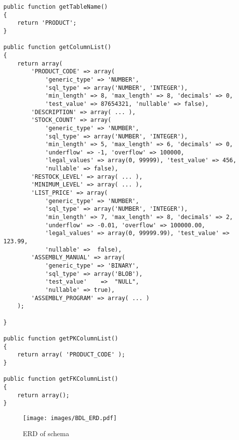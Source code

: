 \documentclass[sigconf, authordraft]{acmart}
\begin{document}
\begin{table}
    \footnotesize
    \begin{verbatim}
public function getTableName()
{
    return 'PRODUCT';
}

public function getColumnList()
{
    return array(
        'PRODUCT_CODE' => array(
            'generic_type' => 'NUMBER',
            'sql_type' => array('NUMBER', 'INTEGER'),
            'min_length' => 8, 'max_length' => 8, 'decimals' => 0,
            'test_value' => 87654321, 'nullable' => false),
        'DESCRIPTION' => array( ... ),
        'STOCK_COUNT' => array(
            'generic_type' => 'NUMBER',
            'sql_type' => array('NUMBER', 'INTEGER'),
            'min_length' => 5, 'max_length' => 6, 'decimals' => 0,
            'underflow' => -1, 'overflow' => 100000,
            'legal_values' => array(0, 99999), 'test_value' => 456,
            'nullable' => false),
        'RESTOCK_LEVEL' => array( ... ),
        'MINIMUM_LEVEL' => array( ... ),
        'LIST_PRICE' => array(
            'generic_type' => 'NUMBER',
            'sql_type' => array('NUMBER', 'INTEGER'),
            'min_length' => 7, 'max_length' => 8, 'decimals' => 2,
            'underflow' => -0.01, 'overflow' => 100000.00,
            'legal_values' => array(0, 99999.99), 'test_value' => 123.99,
            'nullable' =>  false),
        'ASSEMBLY_MANUAL' => array(
            'generic_type' => 'BINARY',
            'sql_type' => array('BLOB'),
            'test_value'    =>  "NULL",
            'nullable' => true),
        'ASSEMBLY_PROGRAM' => array( ... )
    );

}

public function getPKColumnList()
{
    return array( 'PRODUCT_CODE' );
}

public function getFKColumnList()
{
    return array();
}   \end{verbatim}
    \caption{Example of table specification}
\end{table}

\begin{figure}
    \centering
    \texttt{[image: images/BDL\_ERD.pdf]} 
    \caption{ERD of schema}
\end{figure}
\end{document}
